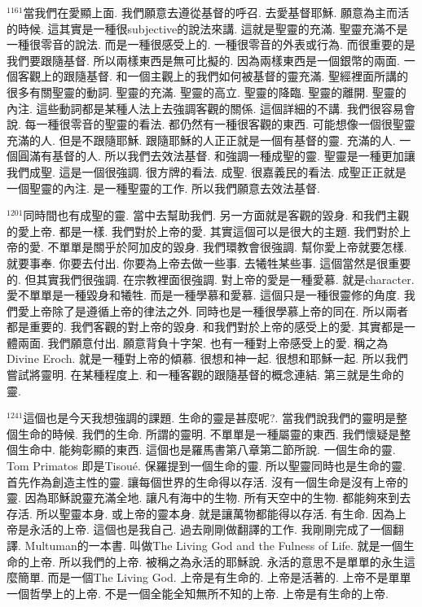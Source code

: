 \documentclass{book}
\begin{document}
$^{1161}$當我們在愛顯上面.
我們願意去遵從基督的呼召.
去愛基督耶穌.
願意為主而活的時候.
這其實是一種很subjective的說法來講.
這就是聖靈的充滿.
聖靈充滿不是一種很零音的說法.
而是一種很感受上的.
一種很零音的外表或行為.
而很重要的是我們要跟隨基督.
所以兩樣東西是無可比擬的.
因為兩樣東西是一個銀幣的兩面.
一個客觀上的跟隨基督.
和一個主觀上的我們如何被基督的靈充滿.
聖經裡面所講的很多有關聖靈的動詞.
聖靈的充滿.
聖靈的高立.
聖靈的降臨.
聖靈的離開.
聖靈的內注.
這些動詞都是某種人法上去強調客觀的關係.
這個詳細的不講.
我們很容易會說.
每一種很零音的聖靈的看法.
都仍然有一種很客觀的東西.
可能想像一個很聖靈充滿的人.
但是不跟隨耶穌.
跟隨耶穌的人正正就是一個有基督的靈.
充滿的人.
一個圓滿有基督的人.
所以我們去效法基督.
和強調一種成聖的靈.
聖靈是一種更加讓我們成聖.
這是一個很強調.
很方牌的看法.
成聖.
很嘉義民的看法.
成聖正正就是一個聖靈的內注.
是一種聖靈的工作.
所以我們願意去效法基督.

$^{1201}$同時間也有成聖的靈.
當中去幫助我們.
另一方面就是客觀的毀身.
和我們主觀的愛上帝.
都是一樣.
我們對於上帝的愛.
其實這個可以是很大的主題.
我們對於上帝的愛.
不單單是關乎於阿加皮的毀身.
我們環教會很強調.
幫你愛上帝就要怎樣.
就要事奉.
你要去付出.
你要為上帝去做一些事.
去犧牲某些事.
這個當然是很重要的.
但其實我們很強調.
在宗教裡面很強調.
對上帝的愛是一種愛慕.
就是character.
愛不單單是一種毀身和犧牲.
而是一種學慕和愛慕.
這個只是一種很靈修的角度.
我們愛上帝除了是遵循上帝的律法之外.
同時也是一種很學慕上帝的同在.
所以兩者都是重要的.
我們客觀的對上帝的毀身.
和我們對於上帝的感受上的愛.
其實都是一體兩面.
我們願意付出.
願意背負十字架.
也有一種對上帝感受上的愛.
稱之為Divine Eroch.
就是一種對上帝的傾慕.
很想和神一起.
很想和耶穌一起.
所以我們嘗試將靈明.
在某種程度上.
和一種客觀的跟隨基督的概念連結.
第三就是生命的靈.

$^{1241}$這個也是今天我想強調的課題.
生命的靈是甚麼呢?.
當我們說我們的靈明是整個生命的時候.
我們的生命.
所謂的靈明.
不單單是一種屬靈的東西.
我們懷疑是整個生命中.
能夠彰顯的東西.
這個也是羅馬書第八章第二節所說.
一個生命的靈.
Tom Primatos 即是Tisoué.
保羅提到一個生命的靈.
所以聖靈同時也是生命的靈.
首先作為創造主性的靈.
讓每個世界的生命得以存活.
沒有一個生命是沒有上帝的靈.
因為耶穌說靈充滿全地.
讓凡有海中的生物.
所有天空中的生物.
都能夠來到去存活.
所以聖靈本身.
或上帝的靈本身.
就是讓萬物都能得以存活.
有生命.
因為上帝是永活的上帝.
這個也是我自己.
過去剛剛做翻譯的工作.
我剛剛完成了一個翻譯.
Multuman的一本書.
叫做The Living God and the Fulness of Life.
就是一個生命的上帝.
所以我們的上帝.
被稱之為永活的耶穌說.
永活的意思不是單單的永生這麼簡單.
而是一個The Living God.
上帝是有生命的.
上帝是活著的.
上帝不是單單一個哲學上的上帝.
不是一個全能全知無所不知的上帝.
上帝是有生命的上帝.
\end{document}
